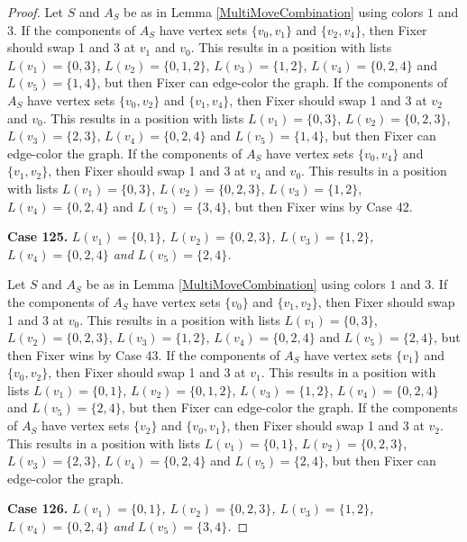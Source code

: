 \documentclass[12pt]{amsart}
\theoremstyle{plain}
\theoremstyle{definition}
\theoremstyle{remark}
\begin{document}
\begin{proof}
Let $S$ and $A_S$ be as in Lemma \ref{MultiMoveCombination} using colors $1$ and $3$. If the components of $A_S$ have vertex sets $\{v_0, v_1\}$ and $\{v_2, v_4\}$, then Fixer should swap 1 and 3 at $v_1$ and $v_0$. This results in a position with lists $L(v_1) = \{0, 3\}$, $L(v_2) = \{0, 1, 2\}$, $L(v_3) = \{1, 2\}$, $L(v_4) = \{0, 2, 4\}$ and $L(v_5) = \{1, 4\}$, but then Fixer can edge-color the graph.
If the components of $A_S$ have vertex sets $\{v_0, v_2\}$ and $\{v_1, v_4\}$, then Fixer should swap 1 and 3 at $v_2$ and $v_0$. This results in a position with lists $L(v_1) = \{0, 3\}$, $L(v_2) = \{0, 2, 3\}$, $L(v_3) = \{2, 3\}$, $L(v_4) = \{0, 2, 4\}$ and $L(v_5) = \{1, 4\}$, but then Fixer can edge-color the graph.
If the components of $A_S$ have vertex sets $\{v_0, v_4\}$ and $\{v_1, v_2\}$, then Fixer should swap 1 and 3 at $v_4$ and $v_0$. This results in a position with lists $L(v_1) = \{0, 3\}$, $L(v_2) = \{0, 2, 3\}$, $L(v_3) = \{1, 2\}$, $L(v_4) = \{0, 2, 4\}$ and $L(v_5) = \{3, 4\}$, but then Fixer wins by Case 42.

\noindent\textbf{Case 125.  }\textit{$L(v_1) = \{0, 1\}$, $L(v_2) = \{0, 2, 3\}$, $L(v_3) = \{1, 2\}$, $L(v_4) = \{0, 2, 4\}$ and $L(v_5) = \{2, 4\}$.}

Let $S$ and $A_S$ be as in Lemma \ref{MultiMoveCombination} using colors $1$ and $3$. If the components of $A_S$ have vertex sets $\{v_0\}$ and $\{v_1, v_2\}$, then Fixer should swap 1 and 3 at $v_0$. This results in a position with lists $L(v_1) = \{0, 3\}$, $L(v_2) = \{0, 2, 3\}$, $L(v_3) = \{1, 2\}$, $L(v_4) = \{0, 2, 4\}$ and $L(v_5) = \{2, 4\}$, but then Fixer wins by Case 43.
If the components of $A_S$ have vertex sets $\{v_1\}$ and $\{v_0, v_2\}$, then Fixer should swap 1 and 3 at $v_1$. This results in a position with lists $L(v_1) = \{0, 1\}$, $L(v_2) = \{0, 1, 2\}$, $L(v_3) = \{1, 2\}$, $L(v_4) = \{0, 2, 4\}$ and $L(v_5) = \{2, 4\}$, but then Fixer can edge-color the graph.
If the components of $A_S$ have vertex sets $\{v_2\}$ and $\{v_0, v_1\}$, then Fixer should swap 1 and 3 at $v_2$. This results in a position with lists $L(v_1) = \{0, 1\}$, $L(v_2) = \{0, 2, 3\}$, $L(v_3) = \{2, 3\}$, $L(v_4) = \{0, 2, 4\}$ and $L(v_5) = \{2, 4\}$, but then Fixer can edge-color the graph.

\noindent\textbf{Case 126.  }\textit{$L(v_1) = \{0, 1\}$, $L(v_2) = \{0, 2, 3\}$, $L(v_3) = \{1, 2\}$, $L(v_4) = \{0, 2, 4\}$ and $L(v_5) = \{3, 4\}$.}


\end{proof}
\end{document}
